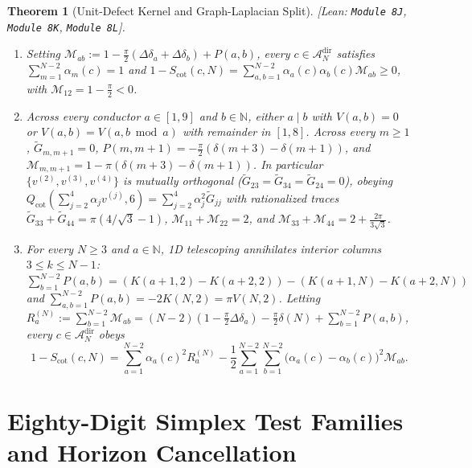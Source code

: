 \documentclass[10pt,a4paper]{article}
\newtheorem{theorem}{Theorem}[section]
\theoremstyle{definition}
\begin{document}
\begin{theorem}[Unit-Defect Kernel and Graph-Laplacian Split]\label{thm:unit_defect}
\emph{[Lean: \texttt{Module~8J}, \texttt{Module~8K}, \texttt{Module~8L}].}
\begin{enumerate}[leftmargin=1.8em,itemsep=2pt]
\item Setting $\mathcal{M}_{ab} := 1 - \tfrac{\pi}{2}(\Delta\delta_a + \Delta\delta_b) + P(a,b)$, every $c \in \mathcal{A}_N^{\mathrm{dir}}$ satisfies $\sum_{m=1}^{N-2} \alpha_m(c) = 1$ and $1 - S_{\mathrm{cot}}(c,N) = \sum_{a,b=1}^{N-2} \alpha_a(c)\alpha_b(c)\mathcal{M}_{ab} \ge 0$, with $\mathcal{M}_{12} = 1 - \tfrac{\pi}{2} < 0$.
\item Across every conductor $a \in [1, 9]$ and $b \in \mathbb{N}$, either $a \mid b$ with $V(a,b) = 0$ or $V(a,b) = V(a, b \bmod a)$ with remainder in $[1,8]$. Across every $m \ge 1$, $\widetilde{G}_{m, m+1} = 0$, $P(m, m+1) = -\tfrac{\pi}{2}(\delta(m+3)-\delta(m+1))$, and $\mathcal{M}_{m,m+1} = 1 - \pi(\delta(m+3)-\delta(m+1))$. In particular $\{v^{(2)},v^{(3)},v^{(4)}\}$ is mutually orthogonal ($\widetilde{G}_{23} = \widetilde{G}_{34} = \widetilde{G}_{24} = 0$), obeying $Q_{\mathrm{cot}}(\sum_{j=2}^4 \alpha_j v^{(j)}, 6) = \sum_{j=2}^4 \alpha_j^2 \widetilde{G}_{jj}$ with rationalized traces $\widetilde{G}_{33}+\widetilde{G}_{44} = \pi(4/\sqrt{3}-1)$, $\mathcal{M}_{11}+\mathcal{M}_{22}=2$, and $\mathcal{M}_{33}+\mathcal{M}_{44}=2+\tfrac{2\pi}{3\sqrt{3}}$.
\item For every $N \ge 3$ and $a \in \mathbb{N}$, 1D telescoping annihilates interior columns $3 \le k \le N-1$: $\sum_{b=1}^{N-2} P(a,b) = (K(a+1,2)-K(a+2,2)) - (K(a+1,N)-K(a+2,N))$ and $\sum_{a,b=1}^{N-2} P(a,b) = -2 K(N,2) = \pi V(N,2)$. Letting $R_a^{(N)} := \sum_{b=1}^{N-2}\mathcal{M}_{ab} = (N-2)(1-\tfrac{\pi}{2}\Delta\delta_a) - \tfrac{\pi}{2}\delta(N) + \sum_{b=1}^{N-2} P(a,b)$, every $c \in \mathcal{A}_N^{\mathrm{dir}}$ obeys
\begin{equation}\label{eq:graph_laplacian}
1 - S_{\mathrm{cot}}(c,N) = \sum_{a=1}^{N-2}\alpha_a(c)^2 R_a^{(N)} - \frac{1}{2}\sum_{a=1}^{N-2}\sum_{b=1}^{N-2}\bigl(\alpha_a(c)-\alpha_b(c)\bigr)^2\mathcal{M}_{ab}.
\end{equation}
\end{enumerate}
\end{theorem}

\section{Eighty-Digit Simplex Test Families and Horizon Cancellation}
\end{document}
